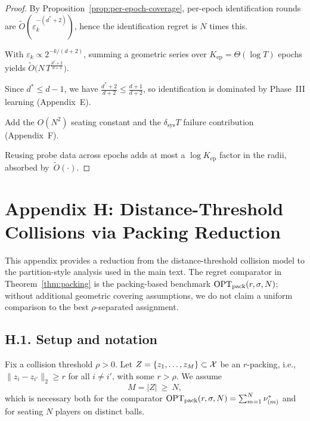 \begin{proof}
By Proposition~\ref{prop:per-epoch-coverage}, per-epoch identification rounds are $\tilde O(\varepsilon_k^{-(d^{*}+2)})$, hence the identification regret is $N$ times this. 

With $\varepsilon_k\propto 2^{-k/(d+2)}$, summing a geometric series over $K_{\text{ep}}=\Theta(\log T)$ epochs yields $\tilde O\!\big(N\,T^{\frac{d^{*}+2}{d+2}}\big)$. 

Since $d^{*}\le d-1$, we have $\frac{d^{*}+2}{d+2}\le \frac{d+1}{d+2}$, so identification is dominated by Phase~III learning (Appendix~E). 

Add the $O(N^2)$ seating constant and the $\delta_{\text{sys}}T$ failure contribution (Appendix~F). 

Reusing probe data across epochs adds at most a $\log K_{\text{ep}}$ factor in the radii, absorbed by~$\tilde O(\cdot)$.
\end{proof}








\bigskip






\section*{Appendix H: Distance-Threshold Collisions via Packing Reduction}
\label{app:packing}

This appendix provides a reduction from the distance-threshold collision model to the partition-style analysis used in the main text. The regret comparator in Theorem~\ref{thm:packing} is the packing-based benchmark $\mathrm{OPT}_{\mathrm{pack}}(r,\sigma,N)$; without additional geometric covering assumptions, we do not claim a uniform comparison to the best $\rho$-separated assignment.

\subsection*{H.1.\; Setup and notation}

Fix a collision threshold $\rho>0$. Let $Z=\{z_1,\dots,z_M\}\subset \mathcal{X}$ be an  {$r$-packing}, i.e., $\|z_i-z_{i'}\|_2\ge r$ for all $i\ne i'$, with some $r>\rho$. We assume
\begin{equation}
\label{eq:packing-feasible}
M=|Z|\ \ge\ N,
\end{equation}
which is necessary both for the comparator $\mathrm{OPT}_{\mathrm{pack}}(r,\sigma,N)=\sum_{m=1}^N \nu^\ast_{(m)}$ and for seating $N$ players on distinct balls.

